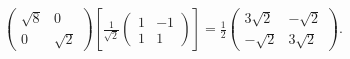 \begin{Exercise}
\begin{enumerate}[(a)]
\begin{solution}
\begin{align*}
\begin{pmatrix}
			\sqrt{8} & 0 \\
			0 & \sqrt{2}
			\end{pmatrix} \left[\frac{1}{\sqrt{2}}\begin{pmatrix}
			1 & -1 \\
			1 & 1
			\end{pmatrix}\right]
			= \frac{1}{2} \begin{pmatrix}
			3\sqrt{2} & -\sqrt{2} \\
			-\sqrt{2} & 3\sqrt{2}
			\end{pmatrix}.
			\end{align*}
		\end{solution}
	\end{enumerate}
\end{Exercise}